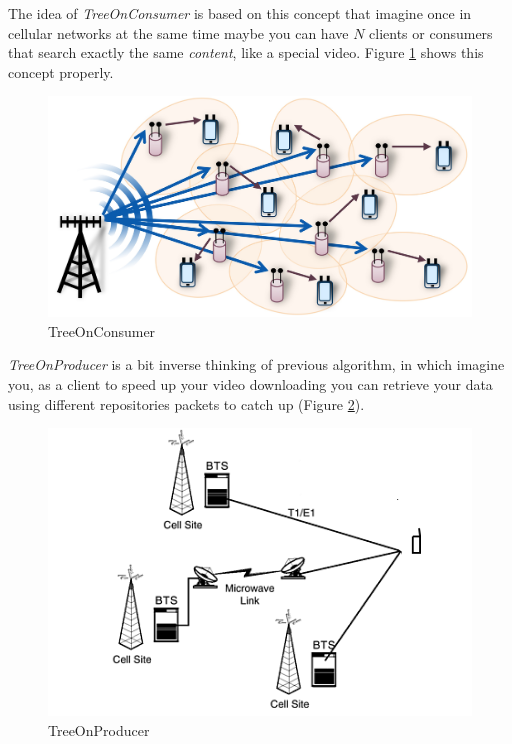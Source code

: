 The idea of \textit{TreeOnConsumer} is based on this concept that imagine once in cellular networks at the same time maybe you can have $N$ clients or consumers that search exactly the same \textit{content}, like a special video. Figure \ref{consumer} shows this concept properly.


\begin{figure}[H]

\begin{center}

\includegraphics[scale = 0.1]{Pictures/treeonconsumer.jpg}

\caption{TreeOnConsumer} \label{consumer} 

\end{center}

\end{figure}
     

\textit{TreeOnProducer} is a bit inverse thinking of previous algorithm, in which imagine you, as a client to speed up your video downloading you can retrieve your data using different repositories packets to catch up (Figure \ref{producer}).

\begin{figure}[H]

\begin{center}

\includegraphics[scale = 0.4]{Pictures/treeonproducer.png}

\caption{TreeOnProducer} \label{producer} 

\end{center}

\end{figure}


